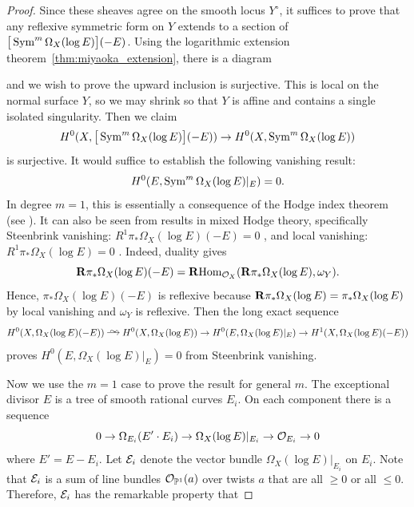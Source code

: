\documentclass[main.tex]{subfiles}
\begin{document}
\begin{proof}
Since these sheaves agree on the smooth locus $Y^{\circ}$, it suffices to prove that any reflexive symmetric form on $Y$ extends to a section of $\big[\operatorname{\mathrm{Sym}}^m \Omega_X(\log{E}) \big](-E)$. Using the logarithmic extension theorem~\ref{thm:miyaoka_extension},
there is a diagram
\begin{center}
\end{center}
and we wish to prove the upward inclusion is surjective.
This is local on the normal surface $Y$, so we may shrink so that $Y$ is affine and contains a single isolated singularity. Then we claim 
\[ H^0(X, \big[\operatorname{\mathrm{Sym}}^m \Omega_X(\log{E}) \big](-E)) \to H^0(X, \operatorname{\mathrm{Sym}}^m \Omega_X(\log{E})) \]
is surjective. It would suffice to establish the following vanishing result:
\[ H^0(E, \operatorname{\mathrm{Sym}}^m \Omega_X(\log{E})|_E) = 0. \]
In degree $m = 1$, this is essentially a consequence of the Hodge index theorem (see \cite[\S5]{mustata:local_vanishing}). It can also be seen from results in mixed Hodge theory, specifically Steenbrink vanishing: $R^1 \pi_* \Omega_X(\log{E})(-E) = 0$ \cite[Theorem~14.1]{greb:differential_forms}, and local vanishing: $R^1 \pi_* \Omega_X(\log{E}) = 0$ \cite[Theorem~B]{mustata:local_vanishing}. Indeed, duality gives
\[ \mathbf{R} \pi_* \Omega_X(\log{E})(-E) = \operatorname{\mathbf{R}\mathrm{Hom}}_{\mathcal{O}_X}(\mathbf{R} \pi_* \Omega_X(\log{E}), \omega_Y). \]
Hence, $\pi_* \Omega_X(\log{E})(-E)$ is reflexive because $\mathbf{R} \pi_* \Omega_X(\log{E}) = \pi_* \Omega_X(\log{E})$ by local vanishing and $\omega_Y$ is reflexive. Then the long exact sequence
\[ H^0(X, \Omega_X(\log{E})(-E)) \iso H^0(X, \Omega_X(\log{E})) \to H^0(E, \Omega_X(\log{E})|_E) \to H^1(X, \Omega_X(\log{E})(-E)) \]
proves $H^0(E, \Omega_X(\log{E})|_E) = 0$ from Steenbrink vanishing.
\par 
Now we use the $m = 1$ case to prove the result for general $m$. The exceptional divisor $E$ is a tree of smooth rational curves $E_i$. On each component there is a sequence
\[ 0 \to \Omega_{E_i}(E' \cdot E_i) \to \Omega_X(\log{E})|_{E_i} \to \mathcal{O}_{E_i} \to 0  \]
where $E' = E - E_i$. Let $\mathcal{E}_i$ denote the vector bundle $\Omega_X(\log{E})|_{E_i}$ on $E_i$. Note that $\mathcal{E}_i$ is a sum of line bundles $\mathcal{O}_{\mathbb{P}^1}(a)$ over twists $a$ that are all $\ge 0$ or all $\le 0$. Therefore, $\mathcal{E}_i$ has the remarkable property that

\end{proof}
\end{document}
